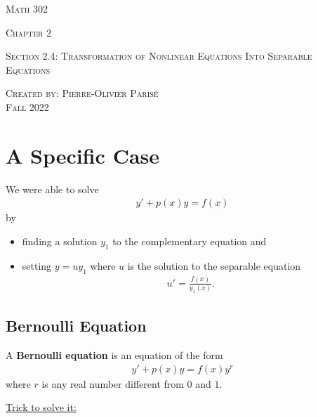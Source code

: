 \documentclass[12pt,a4paper]{article}
\begin{document}
\thispagestyle{empty}

\begin{center}
\vspace*{2.5cm}

{\Huge \textsc{Math 302}}

\vspace*{2cm}

{\LARGE \textsc{Chapter 2}} 

\vspace*{0.75cm}

\noindent\textsc{Section 2.4: Transformation of Nonlinear Equations Into Separable Equations}

\vspace*{0.75cm}

\tableofcontents

\vfill

\noindent \textsc{Created by: Pierre-Olivier Paris{\'e}} \\
\textsc{Fall 2022}
\end{center}

\newpage

\section{A Specific Case}
We were able to solve
	\begin{align*}
	y' + p(x) y = f(x)
	\end{align*}
by 
	\begin{itemize}
	\item finding a solution $y_1$ to the complementary equation and 
	\item setting $y = u y_1$ where $u$ is the solution to the separable equation
	\begin{align*}
	u' = \frac{f(x)}{y_1 (x)} .
	\end{align*}
	\end{itemize}

\subsection{Bernoulli Equation}

A \textbf{Bernoulli equation} is an equation of the form
	\begin{align*}
	y' + p(x) y = f(x) y^r
	\end{align*}
where $r$ is any real number different from $0$ and $1$.

\underline{Trick to solve it:}
\end{document}
